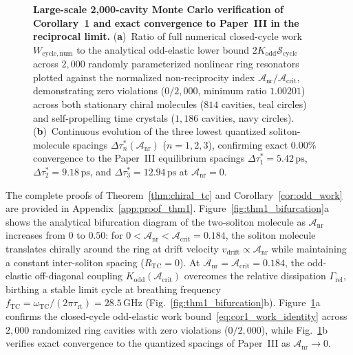 \documentclass[11pt,letterpaper]{article}
\begin{document}
\begin{figure}[t!]
\centering
\resizebox{0.98\textwidth}{!}{}
\caption{\textbf{Large-scale 2,000-cavity Monte Carlo verification of Corollary~1 and exact convergence to Paper~III in the reciprocal limit.} (\textbf{a})~Ratio of full numerical closed-cycle work $W_{\mathrm{cycle,num}}$ to the analytical odd-elastic lower bound $2 K_{\mathrm{odd}}\mathcal{S}_{\mathrm{cycle}}$ across $2{,}000$ randomly parameterized nonlinear ring resonators plotted against the normalized non-reciprocity index $\mathcal{A}_{\mathrm{nr}}/\mathcal{A}_{\mathrm{crit}}$, demonstrating zero violations ($0/2{,}000$, minimum ratio $1.00201$) across both stationary chiral molecules ($814$ cavities, teal circles) and self-propelling time crystals ($1{,}186$ cavities, navy circles). (\textbf{b})~Continuous evolution of the three lowest quantized soliton-molecule spacings $\Delta\tau_n^*(\mathcal{A}_{\mathrm{nr}})$ ($n = 1, 2, 3$), confirming exact $0.00\%$ convergence to the Paper~III equilibrium spacings $\Delta\tau_1^* = 5.42\,\mathrm{ps}$, $\Delta\tau_2^* = 9.18\,\mathrm{ps}$, and $\Delta\tau_3^* = 12.94\,\mathrm{ps}$ at $\mathcal{A}_{\mathrm{nr}} = 0$.}
\label{fig:cor1_mc}
\end{figure}

The complete proofs of Theorem~\ref{thm:chiral_tc} and Corollary~\ref{cor:odd_work} are provided in Appendix~\ref{app:proof_thm1}. Figure~\ref{fig:thm1_bifurcation}a shows the analytical bifurcation diagram of the two-soliton molecule as $\mathcal{A}_{\mathrm{nr}}$ increases from $0$ to $0.50$: for $0 < \mathcal{A}_{\mathrm{nr}} < \mathcal{A}_{\mathrm{crit}} = 0.184$, the soliton molecule translates chirally around the ring at drift velocity $v_{\mathrm{drift}} \propto \mathcal{A}_{\mathrm{nr}}$ while maintaining a constant inter-soliton spacing ($R_{\mathrm{TC}} = 0$). At $\mathcal{A}_{\mathrm{nr}} = \mathcal{A}_{\mathrm{crit}} = 0.184$, the odd-elastic off-diagonal coupling $K_{\mathrm{odd}}(\mathcal{A}_{\mathrm{crit}})$ overcomes the relative dissipation $\Gamma_{\mathrm{rel}}$, birthing a stable limit cycle at breathing frequency $f_{\mathrm{TC}} = \omega_{\mathrm{TC}}/(2\pi\tau_{\mathrm{rt}}) = 28.5\,\mathrm{GHz}$ (Fig.~\ref{fig:thm1_bifurcation}b). Figure~\ref{fig:cor1_mc}a confirms the closed-cycle odd-elastic work bound~\eqref{eq:cor1_work_identity} across $2{,}000$ randomized ring cavities with zero violations ($0/2{,}000$), while Fig.~\ref{fig:cor1_mc}b verifies exact convergence to the quantized spacings of Paper~III as $\mathcal{A}_{\mathrm{nr}} \to 0$.
\end{document}
